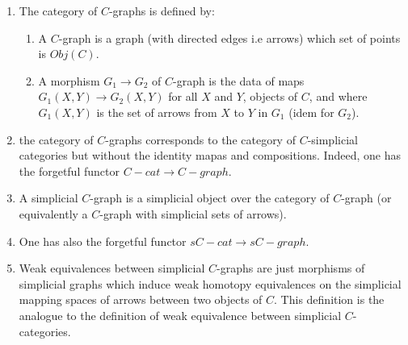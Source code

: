\begin{defin}
\begin{enumerate}
\item The category of $C$-graphs is defined by:
\begin{enumerate}
\item A $C$-graph is a graph (with directed edges i.e arrows) which set of points is $Obj(C)$.
\item A morphism $G_1 \rightarrow G_2$ of $C$-graph is the data of maps $G_1(X,Y) \rightarrow G_2(X,Y)$ for all $X$ and $Y$, objects of $C$, and where $G_1(X,Y)$ is the set of arrows from $X$ to $Y$ in $G_1$ (idem for $G_2$).
\end{enumerate}
\item the category of $C$-graphs corresponds to the category of $C$-simplicial categories but without the identity mapas and compositions. Indeed, one has the forgetful functor $C-cat \rightarrow C-graph$.
\item A simplicial $C$-graph is a simplicial object over the category of $C$-graph (or equivalently a $C$-graph with simplicial sets of arrows).
\item One has also the forgetful functor $sC-cat \rightarrow sC-graph$.
\item Weak equivalences between simplicial $C$-graphs are just morphisms of simplicial graphs which induce weak homotopy equivalences on the simplicial mapping spaces of arrows between two objects of $C$. This definition is the analogue to the definition of weak equivalence between simplicial $C$-categories.  
\end{enumerate}
\end{defin}

